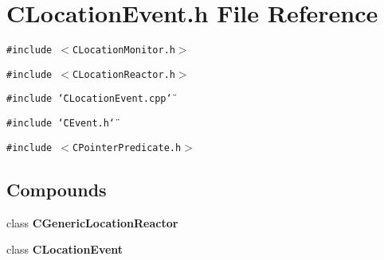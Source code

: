 \section{CLocation\-Event.h File Reference}
\label{CLocationEvent_8h}
{\tt \#include $<$CLocation\-Monitor.h$>$}\par
{\tt \#include $<$CLocation\-Reactor.h$>$}\par
{\tt \#include \char`\"{}CLocation\-Event.cpp\char`\"{}}\par
{\tt \#include \char`\"{}CEvent.h\char`\"{}}\par
{\tt \#include $<$CPointer\-Predicate.h$>$}\par
\subsection*{Compounds}
\begin{CompactItemize}
\item 
class {\bf CGeneric\-Location\-Reactor}
\item 
class {\bf CLocation\-Event}
\end{CompactItemize}
